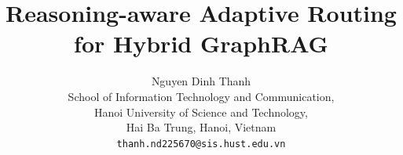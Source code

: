 \documentclass[11pt,twocolumn]{article}
\begin{document}
\title{Reasoning-aware Adaptive Routing for Hybrid GraphRAG}

\author{
  Nguyen Dinh Thanh \\
  School of Information Technology and Communication, \\
  Hanoi University of Science and Technology, \\
  Hai Ba Trung, Hanoi, Vietnam \\
  \texttt{thanh.nd225670@sis.hust.edu.vn}
}

\maketitle

\end{document}
